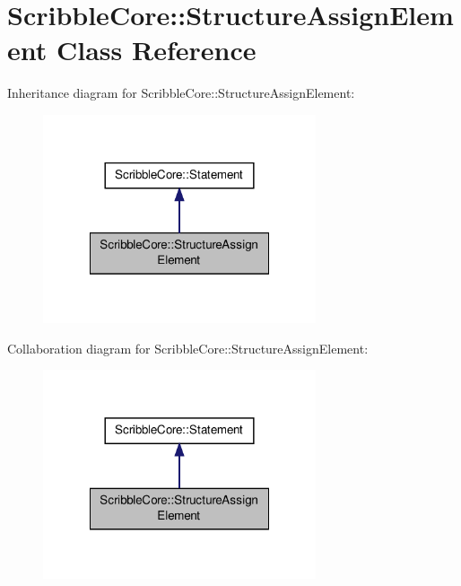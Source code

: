 \hypertarget{class_scribble_core_1_1_structure_assign_element}{\section{Scribble\-Core\-:\-:Structure\-Assign\-Element Class Reference}
\label{class_scribble_core_1_1_structure_assign_element}
}


Inheritance diagram for Scribble\-Core\-:\-:Structure\-Assign\-Element\-:
\nopagebreak
\begin{figure}[H]
\begin{center}
\leavevmode
\includegraphics[width=228pt]{class_scribble_core_1_1_structure_assign_element__inherit__graph}
\end{center}
\end{figure}


Collaboration diagram for Scribble\-Core\-:\-:Structure\-Assign\-Element\-:
\nopagebreak
\begin{figure}[H]
\begin{center}
\leavevmode
\includegraphics[width=228pt]{class_scribble_core_1_1_structure_assign_element__coll__graph}
\end{center}
\end{figure}
